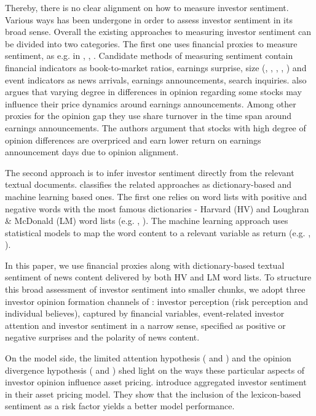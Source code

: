 \documentclass[]{article}
\begin{document}
Thereby, there is no clear alignment on how to measure investor sentiment. Various ways has been undergone in order to assess investor sentiment in its broad sense. Overall the existing approaches to measuring investor sentiment can be divided into two categories. The first one uses financial proxies to measure sentiment, as e.g. in \cite{de1990noise}, \cite{barberis1998model}, \cite{baker2007investor}. Candidate methods of measuring sentiment contain financial indicators as book-to-market ratios, earnings surprise, size (\cite{FRIEND1988}, \cite{FAMA1992},  \cite{KOTHARI1997}, \cite{PONTIFF1998}, \cite{Maheu2004}) and event indicators as news arrivals, earnings announcements, search inquiries. \cite{BERKMAN2009} also argues that varying degree in differences in opinion regarding some stocks may influence their price dynamics around earnings announcements. Among other proxies for the opinion gap they use share turnover in the time span around earnings announcements. The authors argument that stocks with high degree of opinion differences are overpriced and earn lower return on earnings announcement days due to opinion alignment.

The second approach is to infer investor sentiment directly from the relevant textual documents. \cite{Su2021} classifies the related approaches as dictionary-based and machine learning based ones. The first one relies on word lists with positive and negative words with the most famous dictionaries - Harvard (HV) and Loughran \& McDonald (LM) word lists (e.g. \cite{LOUGHRAN2011}, \cite{JEGADEESH2013}). The machine learning approach uses statistical models to map the word content to a relevant variable as return (e.g. \cite{Antweiler2004}, \cite{FANG2021}).

In this paper, we use financial proxies along with dictionary-based textual sentiment of news content delivered by both HV and LM word lists. To structure this broad assessment of investor sentiment into smaller chunks, we adopt three investor opinion formation channels of \cite{Su2021}: investor perception (risk perception and individual believes), captured by financial variables, event-related investor attention and investor sentiment in a narrow sense, specified as positive or negative surprises and the polarity of news content.%

On the model side, the limited attention hypothesis (\cite{corwin2008} and \cite{Loh2010}) and the opinion divergence hypothesis (\cite{BERKMAN2009} and \cite{chatterjee2012}) shed light on the ways these particular aspects of investor opinion influence asset pricing. \cite{fuess2020} introduce aggregated investor sentiment in their asset pricing model. They show that the inclusion of the lexicon-based sentiment as a risk factor yields a better model performance.
\end{document}
